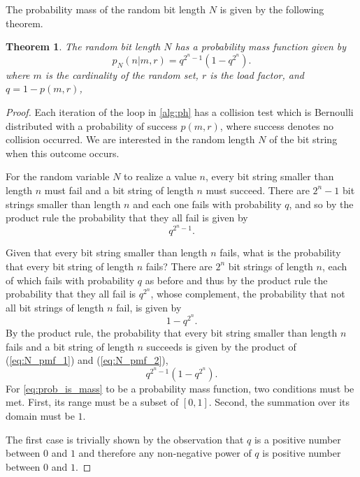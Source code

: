 \documentclass[hidelinks,11pt,final]{article}
\newcommand{\envnumstyle}{section}
\theoremstyle{plain}
\newtheorem{theorem}{Theorem}[\envnumstyle]
\begin{document}
The probability mass of the random bit length $N$ is given by the following theorem.
\begin{theorem}
\label{thm:N_pmf}
The random bit length $N$ has a probability mass function given by
\begin{equation}
\label{eq:N_pmf}
    p_N(n | m, r) = q^{2^n-1}\left(1 - q^{2^n}\right).
\end{equation}
where $m$ is the cardinality of the random set, $r$ is the load factor, and $q = 1 - p(m,r)$, 
\end{theorem}
\begin{proof}
Each iteration of the loop in \cref{alg:ph} has a collision test which is Bernoulli distributed with a probability of success $p(m,r)$, where success denotes no collision occurred. We are interested in the random length $N$ of the bit string when this outcome occurs.

For the random variable $N$ to realize a value $n$, every bit string smaller than length $n$ must fail and a bit string of length $n$ must succeed. There are $2^n-1$ bit strings smaller than length $n$ and each one fails with probability $q$, and so by the product rule the probability that they all fail is given by
\begin{equation}
\label{eq:N_pmf_1}
    q^{2^n - 1}.
\end{equation}

Given that every bit string smaller than length $n$ fails, what is the probability that every bit string of length $n$ fails? There are $2^n$ bit strings of length $n$, each of which fails with probability $q$ as before and thus by the product rule the probability that they all fail is $q^{2^n}$, whose complement, the probability that not all bit strings of length $n$ fail, is given by
\begin{equation}
\label{eq:N_pmf_2}
    1 - q^{2^n}.
\end{equation}
By the product rule, the probability that every bit string smaller than length $n$ fails and a bit string of length $n$ succeeds is given by the product of (\ref{eq:N_pmf_1}) and (\ref{eq:N_pmf_2}),
\begin{equation}
\label{eq:prob_is_mass}
    q^{2^n-1}\left(1 - q^{2^n}\right).
\end{equation}
For \cref{eq:prob_is_mass} to be a probability mass function, two conditions must be met. First, its range must be a subset of $[0,1]$. Second, the summation over its domain must be $1$.

The first case is trivially shown by the observation that $q$ is a positive number between $0$ and $1$ and therefore any non-negative power of $q$ is positive number between $0$ and $1$.


\end{proof}
\end{document}
